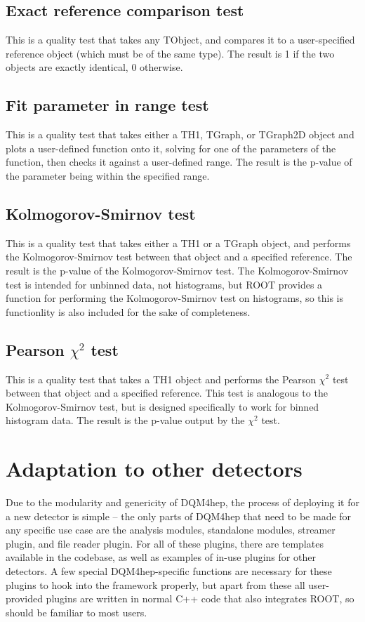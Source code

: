 \subsection{Exact reference comparison test}
This is a quality test that takes any TObject, and compares it to a user-specified reference object (which must be of the same type). The result is 1 if the two objects are exactly identical, 0 otherwise. 

\subsection{Fit parameter in range test}
This is a quality test that takes either a TH1, TGraph, or TGraph2D object and plots a user-defined function onto it, solving for one of the parameters of the function, then checks it against a user-defined range. The result is the p-value of the parameter being within the specified range.

\subsection{Kolmogorov-Smirnov test}
This is a quality test that takes either a TH1 or a TGraph object, and performs the Kolmogorov-Smirnov test between that object and a specified reference. The result is the p-value of the Kolmogorov-Smirnov test. The Kolmogorov-Smirnov test is intended for unbinned data, not histograms, but ROOT provides a function for performing the Kolmogorov-Smirnov test on histograms, so this is functionlity is also included for the sake of completeness.

\subsection{Pearson $\chi^2$ test} %
This is a quality test that takes a TH1 object and performs the Pearson $\chi^2$ test between that object and a specified reference. This test is analogous to the Kolmogorov-Smirnov test, but is designed specifically to work for binned histogram data. The result is the p-value output by the $\chi^2$ test. 

\section{Adaptation to other detectors}
Due to the modularity and genericity of DQM4hep, the process of deploying it for a new detector is simple -- the only parts of DQM4hep that need to be made for any specific use case are the analysis modules, standalone modules, streamer plugin, and file reader plugin. For all of these plugins, there are templates available in the codebase, as well as examples of in-use plugins for other detectors. A few special DQM4hep-specific functions are necessary for these plugins to hook into the framework properly, but apart from these all user-provided plugins are written in normal C++ code that also integrates ROOT, so should be familiar to most users.

